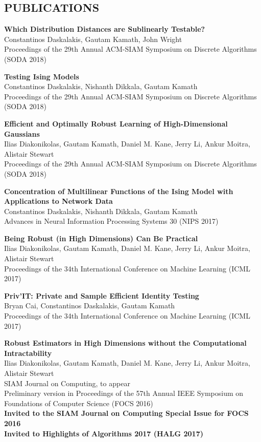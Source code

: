\documentclass{res}
\begin{document}
\begin{resume}
\section{PUBLICATIONS}
      {\bf Which Distribution Distances are Sublinearly Testable?} \\
      Constantinos Daskalakis, Gautam Kamath, John Wright \\
      Proceedings of the 29th Annual ACM-SIAM Symposium on Discrete Algorithms (SODA 2018)

      {\bf Testing Ising Models} \\
      Constantinos Daskalakis, Nishanth Dikkala, Gautam Kamath \\
      Proceedings of the 29th Annual ACM-SIAM Symposium on Discrete Algorithms (SODA 2018)

      {\bf Efficient and Optimally Robust Learning of High-Dimensional Gaussians} \\
      Ilias Diakonikolas, Gautam Kamath, Daniel M. Kane, Jerry Li, Ankur Moitra, Alistair Stewart \\
      Proceedings of the 29th Annual ACM-SIAM Symposium on Discrete Algorithms (SODA 2018)

      {\bf Concentration of Multilinear Functions of the Ising Model with Applications to Network Data} \\
      Constantinos Daskalakis, Nishanth Dikkala, Gautam Kamath \\
      Advances in Neural Information Processing Systems 30 (NIPS 2017)

      {\bf Being Robust (in High Dimensions) Can Be Practical}  \\
      Ilias Diakonikolas, Gautam Kamath, Daniel M. Kane, Jerry Li, Ankur Moitra, Alistair Stewart \\
      Proceedings of the 34th International Conference on Machine Learning (ICML 2017)

      {\bf Priv'IT: Private and Sample Efficient Identity Testing}  \\
      Bryan Cai, Constantinos Daskalakis, Gautam Kamath \\
      Proceedings of the 34th International Conference on Machine Learning (ICML 2017)
     
      {\bf Robust Estimators in High Dimensions without the Computational Intractability} \\
      Ilias Diakonikolas, Gautam Kamath, Daniel M. Kane, Jerry Li, Ankur Moitra, Alistair Stewart \\
      SIAM Journal on Computing, to appear \\
      Preliminary version in Proceedings of the 57th Annual IEEE Symposium on Foundations of Computer Science (FOCS 2016) \\
      {\bf Invited to the SIAM Journal on Computing Special Issue for FOCS 2016} \\
      {\bf Invited to Highlights of Algorithms 2017 (HALG 2017)}


\end{resume}
\end{document}

